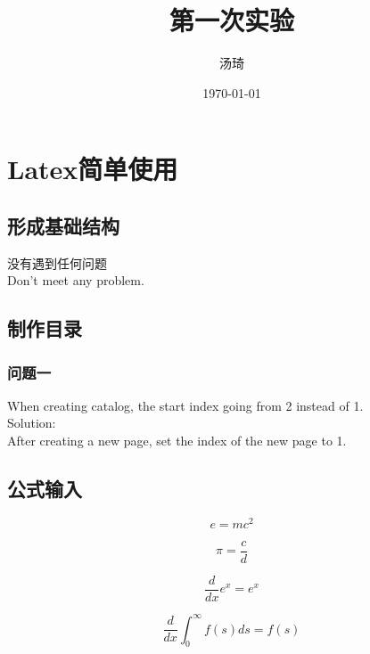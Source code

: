 \documentclass{article}
\begin{document}
    \title{第一次实验}
    \author{汤琦}
    \date{\today}
    \maketitle

    \tableofcontents
    \newpage

    \setcounter{page}{1}
    \section{Latex简单使用}
    \subsection{形成基础结构}
    没有遇到任何问题\\
    Don't meet any problem.

    \subsection{制作目录}
        \subsubsection{问题一}
        When creating catalog, the start index going from 2 instead of 1.\\
        Solution:\\
        After creating a new page, set the index of the new page to 1.

    \subsection{公式输入}
        \begin{equation}
        e=mc^2
        \end{equation}

        \begin{equation}
        \pi = \frac c d
        \end{equation}

        \begin{equation}
        \frac{d}{dx}e^x=e^x
        \end{equation}

        \begin{equation}
        \frac{d}{dx} \int _0 ^\infty {f(s)ds} = f(s)
        \end{equation}
\end{document}

